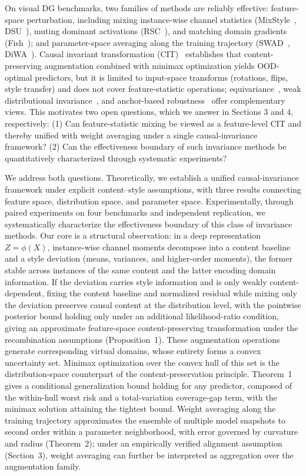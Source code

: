 \documentclass[electronics,article,submit,moreauthors]{Definitions/mdpi}
\newcommand{\add}[1]{\textcolor{addblue}{#1}}
\newcommand{\del}[1]{\textcolor{delred}{\st{#1}}}
\def\add#1{#1}
\def\del#1{}
\begin{document}
On visual DG benchmarks, two families of methods are reliably effective: feature-space perturbation, including mixing instance-wise channel statistics (MixStyle~\citep{ref14}, DSU~\citep{ref15}), muting dominant activations (RSC~\citep{ref16}), and matching domain gradients (Fish~\citep{ref17}); and parameter-space averaging along the training trajectory (SWAD~\citep{ref18}, DiWA~\citep{ref19}). Causal invariant transformation (CIT)~\citep{ref22} establishes that content-preserving augmentation combined with minimax optimization yields OOD-optimal predictors, but it is limited to input-space transforms (rotations, flips, style transfer) and does not cover feature-statistic operations; equivariance~\citep{ref23}, weak distributional invariance~\citep{ref24}, and anchor-based robustness~\citep{ref25} offer complementary views. This motivates two open questions, which we answer in Sections 3 and 4, respectively: (1) Can feature-statistic mixing be viewed as a feature-level CIT and thereby unified with weight averaging under a single causal-invariance framework? (2) Can the effectiveness boundary of such invariance methods be quantitatively characterized through systematic experiments?

We address both questions. Theoretically, we establish a unified causal-invariance framework under explicit content--style assumptions, with three results connecting feature space, distribution space, and parameter space. Experimentally, through paired experiments on four benchmarks and independent replication, we systematically characterize the \del{validity}\add{effectiveness} boundary of this class of invariance methods. Our core is a structural observation: in a deep representation $Z=\phi(X)$, instance-wise channel moments decompose into a content baseline and a style deviation (means, variances, and higher-order moments), the former stable across instances of the same content and the latter encoding domain information. If the deviation carries style information and is only weakly content-dependent, fixing the content baseline and normalized residual while mixing only the deviation \del{preserves causal content up to a quantifiable tolerance}\add{preserves causal content at the distribution level, with the pointwise posterior bound holding only under an additional likelihood-ratio condition}, giving an approximate feature-space content-preserving transformation under the recombination assumptions (Proposition~1). These augmentation operations generate corresponding virtual domains, whose entirety forms a convex uncertainty set. Minimax optimization over the convex hull of this set is the distribution-space counterpart of the content-preservation principle. Theorem~1 gives a conditional generalization bound holding for any predictor, composed of the within-hull worst risk and a total-variation coverage-gap term, with the minimax solution attaining the tightest bound. Weight averaging along the training trajectory approximates the ensemble of multiple model snapshots to second order within a parameter neighborhood, with error governed by curvature and radius (Theorem~2); under an empirically verified alignment assumption (Section~3), weight averaging can further be interpreted as aggregation over the augmentation family.
\end{document}
